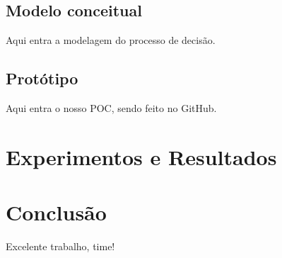 \documentclass[pfc]{imetex}
\begin{document}
\section{Modelo conceitual}
\label{modelo}
Aqui entra a modelagem do processo de decisão.

\section{Protótipo}
\label{prototipo}
Aqui entra o nosso POC, sendo feito no GitHub.

\chapter{Experimentos e Resultados}
\label{experimentos}

\chapter{Conclusão}
\label{conclusao}

Excelente trabalho, time!
\end{document}

